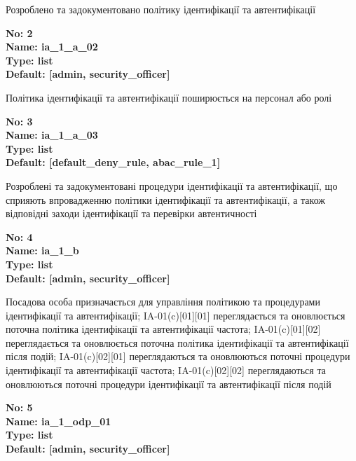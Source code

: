 \documentclass{article}
\begin{document}
{\footnotesize Розроблено та задокументовано політику ідентифікації та автентифікації}


{\footnotesize\bfseries
No: 2\\
Name: ia\_\allowbreak{}1\_\allowbreak{}a\_\allowbreak{}02\\
Type: list\\
Default: [\textquotedbl{}admin\textquotedbl{}, \textquotedbl{}security\_\allowbreak{}officer\textquotedbl{}]
}

{\footnotesize Політика ідентифікації та автентифікації поширюється на персонал або ролі}


{\footnotesize\bfseries
No: 3\\
Name: ia\_\allowbreak{}1\_\allowbreak{}a\_\allowbreak{}03\\
Type: list\\
Default: [\textquotedbl{}default\_\allowbreak{}deny\_\allowbreak{}rule\textquotedbl{}, \textquotedbl{}abac\_\allowbreak{}rule\_\allowbreak{}1\textquotedbl{}]
}

{\footnotesize Розроблені та задокументовані процедури ідентифікації та автентифікації, що сприяють впровадженню політики ідентифікації та автентифікації, а також відповідні заходи ідентифікації та перевірки автентичності}


{\footnotesize\bfseries
No: 4\\
Name: ia\_\allowbreak{}1\_\allowbreak{}b\\
Type: list\\
Default: [\textquotedbl{}admin\textquotedbl{}, \textquotedbl{}security\_\allowbreak{}officer\textquotedbl{}]
}

{\footnotesize Посадова особа призначається для управління політикою та процедурами ідентифікації та автентифікації; IA-01(c)[01][01] переглядається та оновлюється поточна політика ідентифікації та автентифікації частота; IA-01(c)[01][02] переглядається та оновлюється поточна політика ідентифікації та автентифікації після подій; IA-01(c)[02][01] переглядаються та оновлюються поточні процедури ідентифікації та автентифікації частота; IA-01(c)[02][02] переглядаються та оновлюються поточні процедури ідентифікації та автентифікації після подій}


{\footnotesize\bfseries
No: 5\\
Name: ia\_\allowbreak{}1\_\allowbreak{}odp\_\allowbreak{}01\\
Type: list\\
Default: [\textquotedbl{}admin\textquotedbl{}, \textquotedbl{}security\_\allowbreak{}officer\textquotedbl{}]
}
\end{document}
